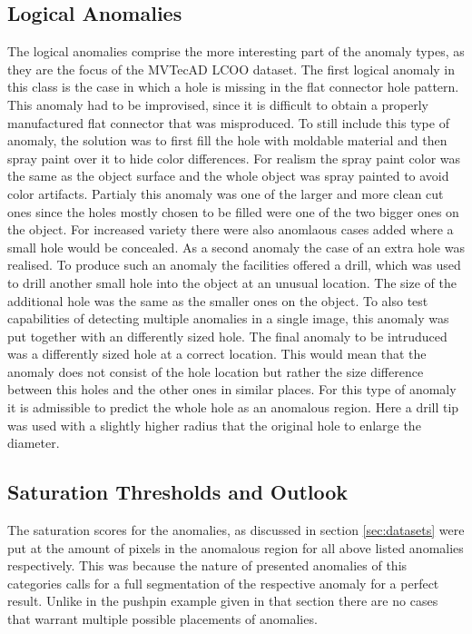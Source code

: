 \subsection{Logical Anomalies}
The logical anomalies comprise the more interesting part of the anomaly types, as they are the focus of the MVTecAD LCOO dataset. The first logical anomaly in this class is the case in which a hole 
is missing in the flat connector hole pattern. This anomaly had to be improvised, since it is difficult to obtain a properly manufactured flat connector that was misproduced. To still include 
this type of anomaly, the solution was to first fill the hole with moldable material and then spray paint over it to hide color differences. For realism the spray paint color was the same as the 
object surface and the whole object was spray painted to avoid color artifacts. Partialy this anomaly was one of the larger and more clean cut ones since the holes mostly chosen to be filled were one of the two 
bigger ones on the object. For increased variety there were also anomlaous cases added where a small hole would be concealed. As a second anomaly the case of an extra hole was realised. To produce such an anomaly the facilities offered a drill, which was used to drill another small hole into 
the object at an unusual location. The size of the additional hole was the same as the smaller ones on the object. To also test capabilities of detecting multiple anomalies in a single image, this anomaly 
was put together with an differently sized hole. The final anomaly to be intruduced was a differently sized hole at a correct 
location. This would mean that the anomaly does not consist of the hole location but rather the size difference between this holes and the other ones in similar places. For this type of anomaly it 
is admissible to predict the whole hole as an anomalous region.  %
Here a drill tip was used with a slightly higher radius that the original hole to enlarge the diameter.


\subsection{Saturation Thresholds and Outlook}

The saturation scores for the anomalies, as discussed in section \ref{sec:datasets} were put at the amount of pixels in the anomalous region for all above listed anomalies respectively.
This was because the nature of presented anomalies of this categories calls for a full segmentation of the respective anomaly for a perfect result. Unlike in the pushpin example given in that section 
there are no cases that warrant multiple possible placements of anomalies.






